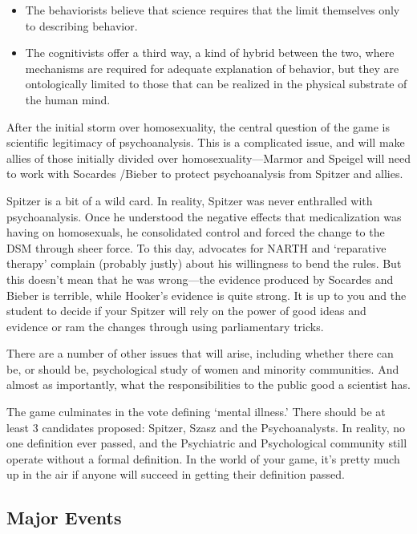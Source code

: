 \begin{refsection}
\begin{itemize}
\item The behaviorists believe that science requires that the limit themselves only to describing behavior. 

\item The cognitivists offer a third way, a kind of hybrid between the two, where mechanisms are required for adequate explanation of behavior, but they are ontologically limited to those that can be realized in the physical substrate of the human mind.

\end{itemize}

After the initial storm over homosexuality, the central question of the game is scientific legitimacy of psychoanalysis. This is a complicated issue, and will make allies of those initially divided over homosexuality---Marmor and Speigel will need to work with Socardes \slash  Bieber to protect psychoanalysis from Spitzer and allies.

Spitzer is a bit of a wild card. In reality, Spitzer was never enthralled with psychoanalysis. Once he understood the negative effects that medicalization was having on homosexuals, he consolidated control and forced the change to the DSM through sheer force. To this day, advocates for NARTH and `reparative therapy' complain (probably justly) about his willingness to bend the rules. But this doesn't mean that he was wrong---the evidence produced by Socardes and Bieber is terrible, while Hooker's evidence is quite strong. It is up to you and the student to decide if your Spitzer will rely on the power of good ideas and evidence or ram the changes through using parliamentary tricks.

There are a number of other issues that will arise, including whether there can be, or should be, psychological study of women and minority communities. And almost as importantly, what the responsibilities to the public good a scientist has.

The game culminates in the vote defining `mental illness.' There should be at least 3 candidates proposed: Spitzer, Szasz and the Psychoanalysts. In reality, no one definition ever passed, and the Psychiatric and Psychological community still operate without a formal definition. In the world of your game, it's pretty much up in the air if anyone will succeed in getting their definition passed.

\subsection{Major Events}
\label{majorevents}


\end{refsection}
